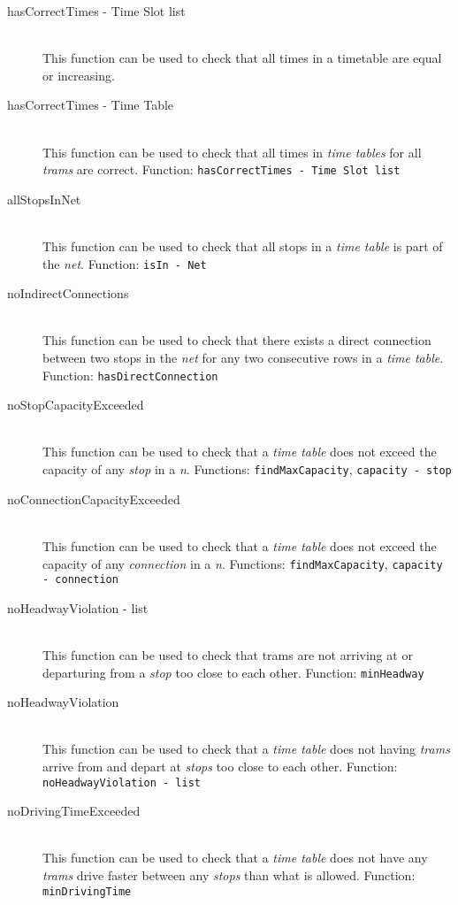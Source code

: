 \documentclass[a4]{article}
\begin{document}
\begin{description}
    \item[hasCorrectTimes - Time Slot list] \hfill \\ This function can be used to check that all times in a timetable are equal or increasing. 
    \item[hasCorrectTimes - Time Table] \hfill \\ This function can be used to check that all times in \emph{time tables} for all \emph{trams} are correct. Function: \verb=hasCorrectTimes - Time Slot list=
    \item[allStopsInNet] \hfill \\ This function can be used to check that all stops in a \emph{time table} is part of the \emph{net}. Function: \verb=isIn - Net=
    \item[noIndirectConnections] \hfill \\ This function can be used to check that there exists a direct connection between two stops in the \emph{net} for any two consecutive rows in a \emph{time table}. Function: \verb=hasDirectConnection=
    \item[noStopCapacityExceeded] \hfill \\ This function can be used to check that a \emph{time table} does not exceed the capacity of any \emph{stop} in a \emph{n}. Functions: \verb=findMaxCapacity=, \verb=capacity - stop=
    \item[noConnectionCapacityExceeded] \hfill \\ This function can be used to check that a \emph{time table} does not exceed the capacity of any \emph{connection} in a \emph{n}. Functions: \verb=findMaxCapacity=, \verb=capacity - connection=
    \item[noHeadwayViolation - list] \hfill \\ This function can be used to check that trams are not arriving at or departuring from a \emph{stop} too close to each other. Function: \verb=minHeadway=
    \item[noHeadwayViolation] \hfill \\ This function can be used to check that a \emph{time table} does not having \emph{trams} arrive from and depart at \emph{stops} too close to each other. Function: \verb=noHeadwayViolation - list=
    \item[noDrivingTimeExceeded] \hfill \\ This function can be used to check that a \emph{time table} does not have any \emph{trams} drive faster between any \emph{stops} than what is allowed. Function: \verb=minDrivingTime=
\end{description}
\end{document}
